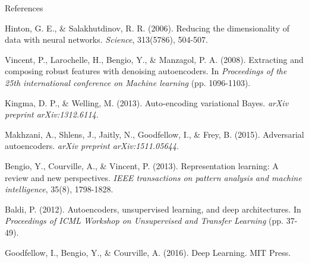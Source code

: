 \begin{frame}[allowframebreaks]{References}
    
    \begin{thebibliography}{99}
        Hinton, G. E., \& Salakhutdinov, R. R. (2006).
        Reducing the dimensionality of data with neural networks.
        \textit{Science}, 313(5786), 504-507.

        Vincent, P., Larochelle, H., Bengio, Y., \& Manzagol, P. A. (2008).
        Extracting and composing robust features with denoising autoencoders.
        In \textit{Proceedings of the 25th international conference on Machine learning} (pp. 1096-1103).

        Kingma, D. P., \& Welling, M. (2013).
        Auto-encoding variational Bayes.
        \textit{arXiv preprint arXiv:1312.6114}.

        Makhzani, A., Shlens, J., Jaitly, N., Goodfellow, I., \& Frey, B. (2015).
        Adversarial autoencoders.
        \textit{arXiv preprint arXiv:1511.05644}.

        Bengio, Y., Courville, A., \& Vincent, P. (2013).
        Representation learning: A review and new perspectives.
        \textit{IEEE transactions on pattern analysis and machine intelligence}, 35(8), 1798-1828.

        Baldi, P. (2012).
        Autoencoders, unsupervised learning, and deep architectures.
        In \textit{Proceedings of ICML Workshop on Unsupervised and Transfer Learning} (pp. 37-49).

        Goodfellow, I., Bengio, Y., \& Courville, A. (2016).
        Deep Learning.
        MIT Press.
    \end{thebibliography}
\end{frame}